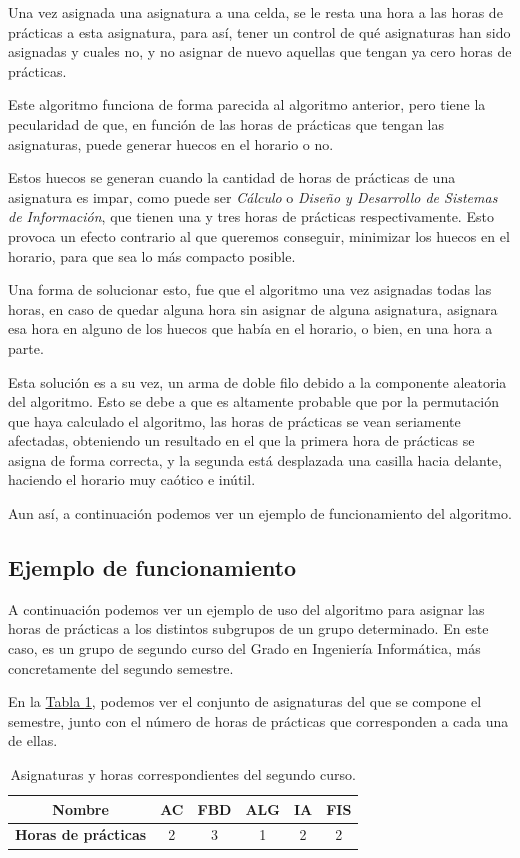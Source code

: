 Una vez asignada una asignatura a una celda, se le resta una hora a las horas de prácticas a esta asignatura, para así, tener un control de qué asignaturas han sido asignadas y cuales no, y no asignar de nuevo aquellas que tengan ya cero horas de prácticas.

Este algoritmo funciona de forma parecida al algoritmo anterior, pero tiene la pecularidad de que, en función de las horas de prácticas que tengan las asignaturas, puede generar huecos en el horario o no. 

Estos huecos se generan cuando la cantidad de horas de prácticas de una asignatura es impar, como puede ser \textit{Cálculo} o \textit{Diseño y Desarrollo de Sistemas de Información}, que tienen una y tres horas de prácticas respectivamente. Esto provoca un efecto contrario al que queremos conseguir, minimizar los huecos en el horario, para que sea lo más compacto posible. 

Una forma de solucionar esto, fue que el algoritmo una vez asignadas todas las horas, en caso de quedar alguna hora sin asignar de alguna asignatura, asignara esa hora en alguno de los huecos que había en el horario, o bien, en una hora a parte. 

Esta solución es a su vez, un arma de doble filo debido a la componente aleatoria del algoritmo. Esto se debe a que es altamente probable que por la permutación que haya calculado el algoritmo, las horas de prácticas se vean seriamente afectadas, obteniendo un resultado en el que la primera hora de prácticas se asigna de forma correcta, y la segunda está desplazada una casilla hacia delante, haciendo el horario muy caótico e inútil.

Aun así, a continuación podemos ver un ejemplo de funcionamiento del algoritmo. 

\subsection{Ejemplo de funcionamiento}

A continuación podemos ver un ejemplo de uso del algoritmo para asignar las horas de prácticas a los distintos subgrupos de un grupo determinado. En este caso, es un grupo de segundo curso del Grado en Ingeniería Informática, más concretamente del segundo semestre.

En la \hyperref[pasig]{Tabla \ref*{pasig}}, podemos ver el conjunto de asignaturas del que se compone el semestre, junto con el número de horas de prácticas que corresponden a cada una de ellas.
\begin{table}[H]
\center
\begin{tabular}{c | c  c  c  c  c}
\textbf{Nombre} & AC & FBD & ALG & IA & FIS \\
\hline
\textbf{Horas de prácticas}  & 2 & 3 & 1 & 2 & 2 \\
\end{tabular}
\caption{Asignaturas y horas correspondientes del segundo curso.}
\label{pasig}
\end{table}

